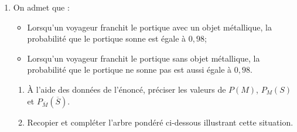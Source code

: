 \begin{enumerate}
     \item
     On admet que :
     \begin{itemize}
          \item Lorsqu'un voyageur franchit le portique avec un objet métallique, la probabilité que le portique sonne est égale à $0,98$;
          \item Lorsqu'un voyageur franchit le portique sans objet métallique, la probabilité que le portique ne sonne pas est aussi égale à $0,98$.
     \end{itemize}
     \begin{enumerate}[label=\alph*.]
          \item  À l'aide des données de l'énoncé, préciser les valeurs de $P(M)$, $P_{M}(S)$ et $P_{\overline{M}}(\overline{S})$.
          \item Recopier et compléter l'arbre pondéré ci-dessous illustrant cette situation.
          \begin{center}
               \begin{extern}%
\end{extern}
\end{center}
\end{enumerate}
\end{enumerate}
